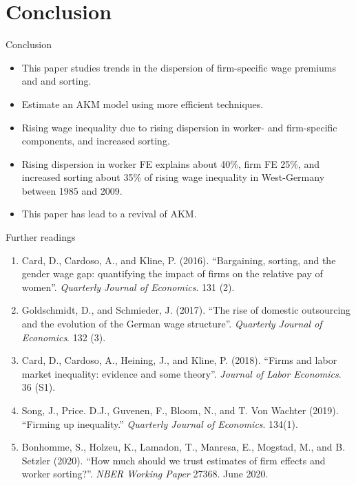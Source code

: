 \documentclass[notes=show]{beamer}
\begin{document}
\section{Conclusion}

\begin{frame}{Conclusion}
\begin{itemize}
	\item This paper studies trends in the dispersion of firm-specific wage premiums and and sorting. \medskip 
	\item Estimate an AKM model using more efficient techniques. \medskip
	\item Rising wage inequality due to rising dispersion in worker- and firm-specific components, and increased sorting. \medskip
    \item Rising dispersion in worker FE explains about 40\%, firm FE 25\%, and increased sorting about 35\% of rising wage inequality in West-Germany between 1985 and 2009. \medskip
    \item This paper has lead to a revival of AKM.
\end{itemize}
\end{frame}

\begin{frame}{Further readings}
\footnotesize
\begin{enumerate}
\item Card, D., Cardoso, A., and Kline, P. (2016). “Bargaining, sorting, and the gender wage gap: quantifying the impact of firms on the relative pay of women”. \textit{Quarterly Journal of Economics}. 131 (2).
\item Goldschmidt, D., and Schmieder, J. (2017). “The rise of domestic outsourcing and the evolution of the German wage structure”. \textit{Quarterly Journal of Economics}. 132 (3).
\item Card, D., Cardoso, A., Heining, J., and Kline, P. (2018). “Firms and labor market inequality: evidence
and some theory”. \textit{Journal of Labor Economics}. 36 (S1).
\item Song, J., Price. D.J., Guvenen, F., Bloom, N., and T. Von Wachter (2019). “Firming up inequality.” \textit{Quarterly Journal of Economics}. 134(1). 
\item Bonhomme, S., Holzeu, K., Lamadon, T., Manresa, E., Mogstad, M., and B. Setzler (2020). “How much should we trust estimates of firm effects and worker sorting?”. \textit{NBER Working Paper} 27368. June 2020. 
\end{enumerate}
\end{frame}
\end{document}
